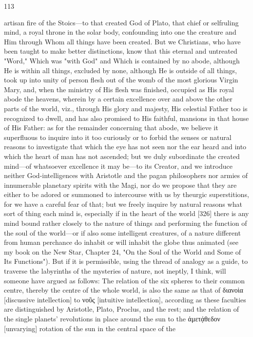 \documentclass{article}
\begin{document}
113

artisan fire of the Stoics—to that created God of Plato, that chief or selfruling mind, a royal throne in the solar body, confounding into one the
creature and Him through Whom all things have been created. But we
Christians, who have been taught to make better distinctions, know that
this eternal and untreated "Word," Which was "with God" and Which is
contained by no abode, although He is within all things, excluded by
none, although He is outside of all things, took up into unity of person
flesh out of the womb of the most glorious Virgin Mary, and, when the
ministry of His flesh was finished, occupied as His royal abode the
heavens, wherein by a certain excellence over and above the other parts
of the world, viz., through His glory and majesty, His celestial Father too
is recognized to dwell, and has also promised to His faithful, mansions in
that house of His Father: as for the remainder concerning that abode, we
believe it superfluous to inquire into it too curiously or to forbid the
senses or natural reasons to investigate that which the eye has not seen
nor the ear heard and into which the heart of man has not ascended; but
we duly subordinate the created mind—of whatsoever excellence it may
be—to its Creator, and we introduce neither God-intelligences with
Aristotle and the pagan philosophers nor armies of innumerable
planetary spirits with the Magi, nor do we propose that they are either to
be adored or summoned to intercourse with us by theurgic superstitions,
for we have a careful fear of that; but we freely inquire by natural reasons
what sort of thing each mind is, especially if in the heart of the world
[326] there is any mind bound rather closely to the nature of things and
performing the function of the soul of the world—or if also some
intelligent creatures, of a nature different from human perchance do
inhabit or will inhabit the globe thus animated (see my book on the New
Star, Chapter 24, "On the Soul of the World and Some of Its Functions").
But if it is permissible, using the thread of analogy as a guide, to traverse
the labyrinths of the mysteries of nature, not ineptly, I think, will
someone have argued as follows:
The relation of the six spheres to their common centre, thereby the
centre of the whole world, is also the same as that of διανοὶα [discussive
intellection] to νοῦς [intuitive intellection], according as these faculties
are distinguished by Aristotle, Plato, Proclus, and the rest; and the
relation of the single planets' revolutions in place around the sun to the
ἀμετᾴθεδον [unvarying] rotation of the sun in the central space of the
\end{document}

